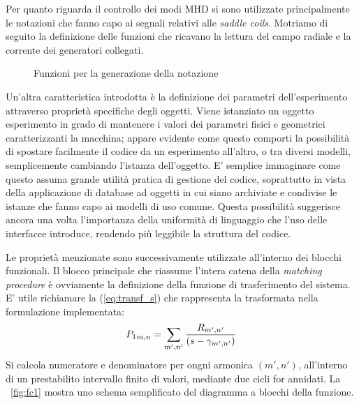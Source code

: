 Per quanto riguarda il controllo dei modi MHD si sono utilizzate
principalmente le notazioni che fanno capo ai segnali relativi alle
\emph{saddle coils}. Motriamo di seguito la definizione delle funzioni
che ricavano la lettura del campo radiale e la corrente dei generatori
collegati.

\begin{figure}[!htb]
 \footnotesize 
 \centering
 \begin{minipage}[c]{11cm}
 \end{minipage}
 \normalsize
 \label{fig:notation}
 \caption{Funzioni per la generazione della notazione}
\end{figure}
%

Un'altra caratteristica introdotta è la definizione dei parametri
dell'esperimento attraverso proprietà specifiche degli oggetti. Viene
istanziato un oggetto esperimento in grado di mantenere i valori dei
parametri fisici e geometrici caratterizzanti la macchina; appare
evidente come questo comporti la possibilità di spostare facilmente il
codice da un esperimento all'altro, o tra diversi modelli, semplicemente
cambiando l'istanza dell'oggetto. E' semplice immaginare come questo
assuma grande utilità pratica di gestione del codice, soprattutto in
vista della applicazione di database ad oggetti in cui siano archiviate
e condivise le istanze che fanno capo ai modelli di uso comune. Questa
possibilità suggerisce ancora una volta l'importanza della uniformità di
linguaggio che l'uso delle interfacce introduce, rendendo più leggibile
la struttura del codice.

Le proprietà menzionate sono successivamente utilizzate all'interno dei
blocchi funzionali. Il blocco principale che riassume l'intera catena
della \emph{matching procedure} è ovviamente la definizione della
funzione di trasferimento del sistema. E' utile richiamare la
(\ref{eq:transf_s}) che rappresenta la trasformata nella formulazione
implementata:
\begin{equation}
{P_1}_{m,n} = \sum_{m',n'} \frac{R_{m',n'}}{(s-\gamma_{m',n'})} \nonumber
\end{equation}
Si calcola numeratore e denominatore per ongni armonica $(m',n')$,
all'interno di un prestabilito intervallo finito di valori, mediante due
cicli for annidati. La \figurename~\ref{fig:fc1} mostra uno schema
semplificato del diagramma a blocchi della funzione. 


